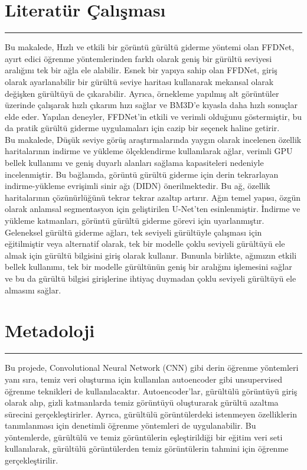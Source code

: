 \documentclass{article}
\begin{document}
\section{Literatür Çalışması}
\rule{\textwidth}{0.5pt}

 \noindent Bu makalede\cite{zhang2018ffdnet}, Hızlı ve etkili bir görüntü gürültü giderme yöntemi olan FFDNet, ayırt edici öğrenme yöntemlerinden farklı olarak geniş bir gürültü seviyesi aralığını tek bir ağla ele alabilir. Esnek bir yapıya sahip olan FFDNet, giriş olarak ayarlanabilir bir gürültü seviye haritası kullanarak mekansal olarak değişken gürültüyü de çıkarabilir. Ayrıca, örnekleme yapılmış alt görüntüler üzerinde çalışarak hızlı çıkarım hızı sağlar ve BM3D'e kıyasla daha hızlı sonuçlar elde eder. Yapılan deneyler, FFDNet'in etkili ve verimli olduğunu göstermiştir, bu da pratik gürültü giderme uygulamaları için cazip bir seçenek haline getirir.\\[10pt]

 \noindent Bu makalede\cite{yu2019deep}, Düşük seviye görüş araştırmalarında yaygın olarak incelenen özellik haritalarının indirme ve yükleme ölçeklendirme kullanılarak ağlar, verimli GPU bellek kullanımı ve geniş duyarlı alanları sağlama kapasiteleri nedeniyle incelenmiştir. Bu bağlamda, görüntü gürültü giderme için derin tekrarlayan indirme-yükleme evrişimli sinir ağı (DIDN) önerilmektedir. Bu ağ, özellik haritalarının çözünürlüğünü tekrar tekrar azaltıp artırır. Ağın temel yapısı, özgün olarak anlamsal segmentasyon için geliştirilen U-Net'ten esinlenmiştir. İndirme ve yükleme katmanları, görüntü gürültü giderme görevi için uyarlanmıştır. Geleneksel gürültü giderme ağları, tek seviyeli gürültüyle çalışması için eğitilmiştir veya alternatif olarak, tek bir modelle çoklu seviyeli gürültüyü ele almak için gürültü bilgisini giriş olarak kullanır. Bununla birlikte, ağımızın etkili bellek kullanımı, tek bir modelle gürültünün geniş bir aralığını işlemesini sağlar ve bu da gürültü bilgisi girişlerine ihtiyaç duymadan çoklu seviyeli gürültüyü ele almasını sağlar.\\[10pt]


\noindent
\section{Metadoloji}
\rule{\textwidth}{0.5pt}
Bu projede, Convolutional Neural Network (CNN) gibi derin öğrenme yöntemleri yanı sıra, temiz veri oluşturma için kullanılan autoencoder gibi unsupervised öğrenme teknikleri de kullanılacaktır. Autoencoder'lar, gürültülü görüntüyü giriş olarak alıp, gizli katmanlarda temiz görüntüyü oluşturarak gürültü azaltma sürecini gerçekleştirirler. Ayrıca, gürültülü görüntülerdeki istenmeyen özelliklerin tanımlanması için denetimli öğrenme yöntemleri de uygulanabilir. Bu yöntemlerde, gürültülü ve temiz görüntülerin eşleştirildiği bir eğitim veri seti kullanılarak, gürültülü görüntülerden temiz görüntülerin tahmini için öğrenme gerçekleştirilir.\\[10pt]
\end{document}
